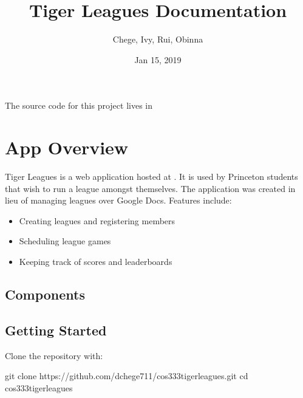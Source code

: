 \documentclass[letterpaper,10pt,english]{sphinxmanual}
\title{Tiger Leagues Documentation}
\date{Jan 15, 2019}
\author{Chege, Ivy, Rui, Obinna}
\begin{document}
\pagestyle{empty}
\sphinxmaketitle
\pagestyle{plain}
\sphinxtableofcontents
\pagestyle{normal}
\label{\detokenize{index::doc}}


The source code for this project lives in 
\label{\detokenize{readme:tiger-leagues-overview}}\label{\detokenize{readme:tiger-leagues-overview}}

\chapter{App Overview}
\label{\detokenize{readme:app-overview}}\label{\detokenize{readme::doc}}
Tiger Leagues is a web application hosted at .
It is used by Princeton students that wish to run a league amongst themselves.
The application was created in lieu of managing leagues over Google Docs.
Features include:
\begin{itemize}
\item {} 
Creating leagues and registering members

\item {} 
Scheduling league games

\item {} 
Keeping track of scores and leaderboards

\end{itemize}


\section{Components}
\label{\detokenize{readme:components}}\label{\detokenize{readme:id1}}
\noindent{}


\section{Getting Started}
\label{\detokenize{readme:getting-started}}\label{\detokenize{readme:id2}}
Clone the repository with:

\begin{sphinxVerbatim}[commandchars=\\\{\}]
\PYGZdl{} git clone https://github.com/dchege711/cos333\PYGZus{}tiger\PYGZus{}leagues.git
\PYGZdl{} cd cos333\PYGZus{}tiger\PYGZus{}leagues
\end{sphinxVerbatim}
\end{document}
